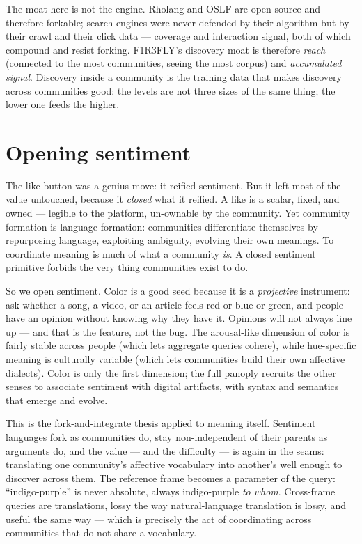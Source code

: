 \documentclass[11pt]{article}
\begin{document}
The moat here is not the engine. Rholang and OSLF are open source and therefore forkable; search engines were never defended by their algorithm but by their crawl and their click data --- coverage and interaction signal, both of which compound and resist forking. F1R3FLY's discovery moat is therefore \emph{reach} (connected to the most communities, seeing the most corpus) and \emph{accumulated signal}. Discovery inside a community is the training data that makes discovery across communities good: the levels are not three sizes of the same thing; the lower one feeds the higher.

\section{Opening sentiment}\label{sec:sentiment}

The like button was a genius move: it reified sentiment. But it left most of the value untouched, because it \emph{closed} what it reified. A like is a scalar, fixed, and owned --- legible to the platform, un-ownable by the community. Yet community formation is language formation: communities differentiate themselves by repurposing language, exploiting ambiguity, evolving their own meanings. To coordinate meaning is much of what a community \emph{is}. A closed sentiment primitive forbids the very thing communities exist to do.

So we open sentiment. Color is a good seed because it is a \emph{projective} instrument: ask whether a song, a video, or an article feels red or blue or green, and people have an opinion without knowing why they have it. Opinions will not always line up --- and that is the feature, not the bug. The arousal-like dimension of color is fairly stable across people (which lets aggregate queries cohere), while hue-specific meaning is culturally variable (which lets communities build their own affective dialects). Color is only the first dimension; the full panoply recruits the other senses to associate sentiment with digital artifacts, with syntax and semantics that emerge and evolve.

This is the fork-and-integrate thesis applied to meaning itself. Sentiment languages fork as communities do, stay non-independent of their parents as arguments do, and the value --- and the difficulty --- is again in the seams: translating one community's affective vocabulary into another's well enough to discover across them. The reference frame becomes a parameter of the query: ``indigo-purple'' is never absolute, always indigo-purple \emph{to whom}. Cross-frame queries are translations, lossy the way natural-language translation is lossy, and useful the same way --- which is precisely the act of coordinating across communities that do not share a vocabulary.
\end{document}
